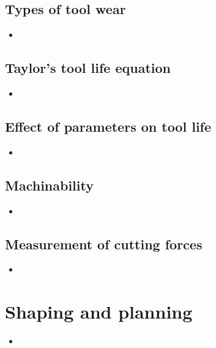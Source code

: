 \documentclass[8pt]{report}
\begin{document}
\section{Types of tool wear}
	\begin{itemize}
		\item
	\end{itemize}\hrulefill
\section{Taylor's tool life equation}
	\begin{itemize}
		\item
	\end{itemize}\hrulefill
\section{Effect of parameters on tool life}
	\begin{itemize}
		\item
	\end{itemize}\hrulefill
\section{Machinability}
	\begin{itemize}
		\item
	\end{itemize}\hrulefill
\section{Measurement of cutting forces}
	\begin{itemize}
		\item
	\end{itemize}\hrulefill
\chapter{Shaping and planning}
	\begin{itemize}
		\item
	\end{itemize}\hrulefill
\end{document}
